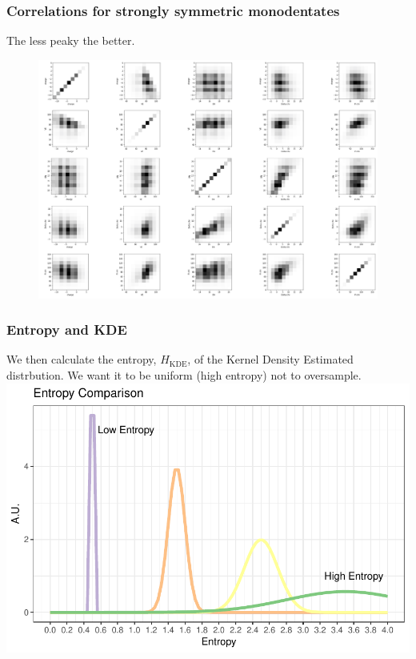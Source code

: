 \documentclass[xcolor=dvipsnames]{beamer}
\begin{document}
\begin{frame}
\frametitle{Correlations for strongly symmetric monodentates}
The less peaky the better.
\begin{figure}
\includegraphics[width=0.65\linewidth]{img/strongsymMonodentates_PairwiseCorr.png}
\end{figure}
\centering
\end{frame}

\begin{frame}
\frametitle{Entropy and KDE}
We then calculate the entropy, $H_{\textrm{KDE}}$, of the Kernel Density Estimated distrbution. We want it to be uniform (high entropy) not to oversample.
\includegraphics[width=0.8\linewidth]{img/entropy_demp.pdf}
\centering
\end{frame}
\end{document}
